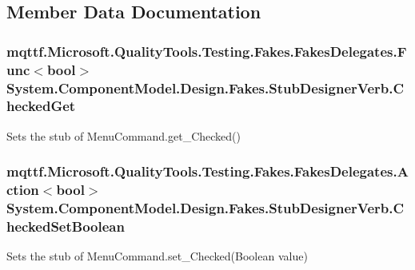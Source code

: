 \subsection{Member Data Documentation}
\hypertarget{class_system_1_1_component_model_1_1_design_1_1_fakes_1_1_stub_designer_verb_a52821b4b0a2a7b93e48dc9760683f169}{
\subsubsection[{Checked\-Get}]{\setlength{\rightskip}{0pt plus 5cm}mqttf.\-Microsoft.\-Quality\-Tools.\-Testing.\-Fakes.\-Fakes\-Delegates.\-Func$<$bool$>$ System.\-Component\-Model.\-Design.\-Fakes.\-Stub\-Designer\-Verb.\-Checked\-Get}}\label{class_system_1_1_component_model_1_1_design_1_1_fakes_1_1_stub_designer_verb_a52821b4b0a2a7b93e48dc9760683f169}


Sets the stub of Menu\-Command.\-get\-\_\-\-Checked()

\hypertarget{class_system_1_1_component_model_1_1_design_1_1_fakes_1_1_stub_designer_verb_a52835685b9410e7c872000f648eb45a7}{
\subsubsection[{Checked\-Set\-Boolean}]{\setlength{\rightskip}{0pt plus 5cm}mqttf.\-Microsoft.\-Quality\-Tools.\-Testing.\-Fakes.\-Fakes\-Delegates.\-Action$<$bool$>$ System.\-Component\-Model.\-Design.\-Fakes.\-Stub\-Designer\-Verb.\-Checked\-Set\-Boolean}}\label{class_system_1_1_component_model_1_1_design_1_1_fakes_1_1_stub_designer_verb_a52835685b9410e7c872000f648eb45a7}


Sets the stub of Menu\-Command.\-set\-\_\-\-Checked(\-Boolean value)

